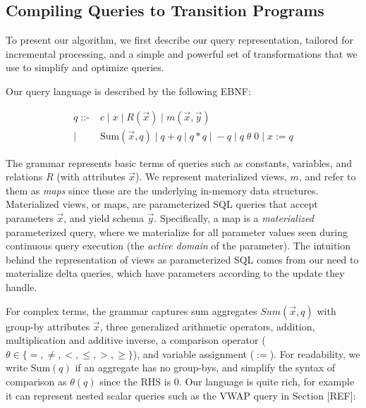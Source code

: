 \vspace{1mm}
\subsection{Compiling Queries to Transition Programs}
\noindent To present our algorithm, we first describe our query representation,
tailored for incremental processing, and a simple and powerful set of transformations
that we use to simplify and optimize queries.

\noindent Our query language is described by the following EBNF:

\def \calcsum{\mbox{Sum}}
\def\calceq{\mbox{{\tt =}}}
\def\calcgt{\mbox{{\tt >}}}
\def\calcgte{\mbox{{\tt >=}}}
\def\calclte{\mbox{{\tt <=}}}
\def\calclt{\mbox{{\tt <}}}

\def \q{q}
\def \qa{q_1}
\def \qb{q_2}
\def \v#1{\mbox{#1}}
\def \vv#1{\mbox{{\tiny #1}}}
\def \z{\mathbb{Z}}

\vspace{-3mm}
\begin{align*} 
\q \; \mbox{::-} &
  \;    c \;|\; x
  \;|\; R(\vec{x}) \;|\; m(\vec{x},\vec{y})
\\
| & \; \calcsum(\vec{x}, \q)
  \;|\; \q + \q \;|\; \q * \q  \;|\; -\q
  \;|\; \q \; \theta \; 0 \;|\; x := \q
\end{align*}

The grammar represents basic terms of queries such as constants, variables, and
relations $R$ (with attributes $\vec{x}$). We represent materialized views, $m$,
and refer to them as \textit{maps} since these are the underlying in-memory data
structures. Materialized views, or maps, are parameterized SQL queries that
accept parameters $\vec{x}$, and yield schema $\vec{y}$.
Specifically, a map is a \textit{materialized} parameterized query,
where we materialize for all parameter values seen during continuous query
execution (the \textit{active domain} of the parameter).
The intuition behind the representation of views as parameterized SQL comes from
our need to materialize delta queries, which have parameters according to the
update they handle.

For complex terms, the grammar captures sum aggregates
$Sum(\vec{x},q)$ with group-by attributes $\vec{x}$, three generalized
arithmetic operators, addition, multiplication and additive inverse, a
comparison operator ($\theta \in \{=,\neq,<,\leq,>,\geq\}$), and variable
assignment ($:=$). For readability, we write $\calcsum(\q)$ if an aggregate
has no group-bys, and simplify the syntax of comparison as $\theta(\q)$ since
the RHS is 0. 
Our language is quite rich, for example it can represent nested scalar
queries such as the VWAP query in Section [REF]:

